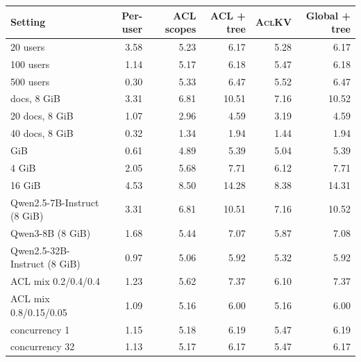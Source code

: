 \begin{tabular}{@{}l r r r r r@{}}
\toprule
Setting & Per-user & ACL scopes & ACL + tree & \textsc{AclKV} & Global + tree \\
\midrule
20 users & 3.58 & 5.23 & 6.17 & 5.28 & 6.17 \\
100 users & 1.14 & 5.17 & 6.18 & 5.47 & 6.18 \\
500 users & 0.30 & 5.33 & 6.47 & 5.52 & 6.47 \\
\addlinespace
10 docs, 8 GiB & 3.31 & 6.81 & 10.51 & 7.16 & 10.52 \\
20 docs, 8 GiB & 1.07 & 2.96 & 4.59 & 3.19 & 4.59 \\
40 docs, 8 GiB & 0.32 & 1.34 & 1.94 & 1.44 & 1.94 \\
\addlinespace
1 GiB & 0.61 & 4.89 & 5.39 & 5.04 & 5.39 \\
4 GiB & 2.05 & 5.68 & 7.71 & 6.12 & 7.71 \\
16 GiB & 4.53 & 8.50 & 14.28 & 8.38 & 14.31 \\
\addlinespace
Qwen2.5-7B-Instruct (8 GiB) & 3.31 & 6.81 & 10.51 & 7.16 & 10.52 \\
Qwen3-8B (8 GiB) & 1.68 & 5.44 & 7.07 & 5.87 & 7.08 \\
Qwen2.5-32B-Instruct (8 GiB) & 0.97 & 5.06 & 5.92 & 5.32 & 5.92 \\
\addlinespace
ACL mix 0.2/0.4/0.4 & 1.23 & 5.62 & 7.37 & 6.10 & 7.37 \\
ACL mix 0.8/0.15/0.05 & 1.09 & 5.16 & 6.00 & 5.16 & 6.00 \\
\addlinespace
concurrency 1 & 1.15 & 5.18 & 6.19 & 5.47 & 6.19 \\
concurrency 32 & 1.13 & 5.17 & 6.17 & 5.47 & 6.17 \\
\bottomrule
\end{tabular}
